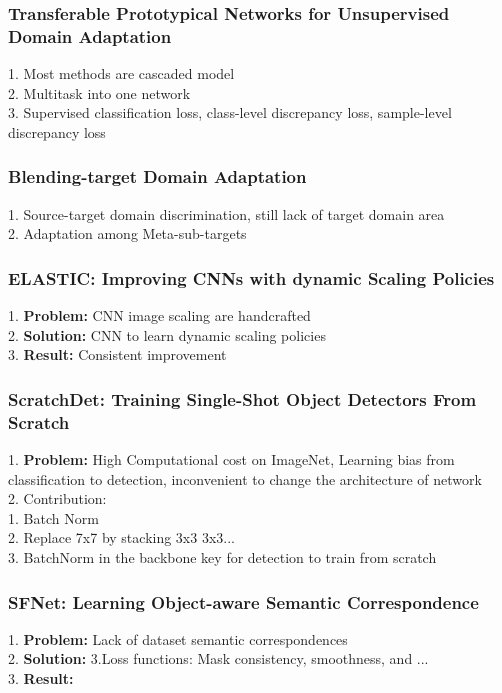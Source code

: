 \subsubsection{Transferable Prototypical Networks for Unsupervised Domain Adaptation}
    1. Most methods are cascaded model \\
    2. Multitask into one network \\
    3. Supervised classification loss, class-level discrepancy loss, sample-level discrepancy loss \\
\subsubsection{Blending-target Domain Adaptation}
    1. Source-target domain discrimination, still lack of target domain area \\
    2. Adaptation among Meta-sub-targets \\
\subsubsection{ELASTIC: Improving CNNs with dynamic Scaling Policies}
    1. {\bf Problem:} CNN image scaling are handcrafted \\
    2. {\bf Solution:} CNN to learn dynamic scaling policies \\
    3. {\bf Result:} Consistent improvement \\
\subsubsection{ScratchDet: Training Single-Shot Object Detectors From Scratch}
    1. {\bf Problem:} High Computational cost on ImageNet, Learning bias from classification to detection, inconvenient to change the architecture of network \\
    2. Contribution:  \\
        1. Batch Norm \\
        2. Replace 7x7 by stacking 3x3 3x3... \\
        3. BatchNorm in the backbone key for detection to train from scratch \\
\subsubsection{SFNet: Learning Object-aware Semantic Correspondence}
    1. {\bf Problem:} Lack of dataset semantic correspondences \\
    2. {\bf Solution:} 3.Loss functions: Mask consistency, smoothness, and ... \\
    3. {\bf Result:}  \\
